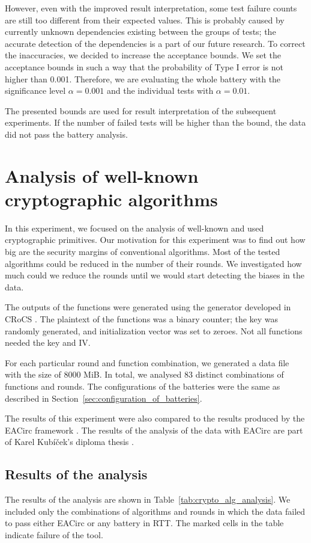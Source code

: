 \documentclass[
	digital,    %
	oneside,
	color,
	11pt,
	nocover,
	notable,
	nolof,
	nolot,
]{fithesis3}
\theoremstyle{definition}
\theoremstyle{remark}
\begin{document}
However, even with the improved result interpretation, some test failure counts are still too different from their expected values. This is probably caused by currently unknown dependencies existing between the groups of tests; the accurate detection of the dependencies is a part of our future research. To correct the inaccuracies, we decided to increase the acceptance bounds. We set the acceptance bounds in such a way that the probability of Type I error is not higher than 0.001. Therefore, we are evaluating the whole battery with the significance level $\alpha=0.001$ and the individual tests with $\alpha=0.01$.

The presented bounds are used for result interpretation of the subsequent experiments. If the number of failed tests will be higher than the bound, the data did not pass the battery analysis.

\section{Analysis of well-known cryptographic algorithms}
\label{sec:usable_testbed}
In this experiment, we focused on the analysis of well-known and used cryptographic primitives. Our motivation for this experiment was to find out how big are the security margins of conventional algorithms. Most of the tested algorithms could be reduced in the number of their rounds. We investigated how much could we reduce the rounds until we would start detecting the biases in the data.

The outputs of the functions were generated using the generator developed in CRoCS \cite{eacirc-streams}. The plaintext of the functions was a binary counter; the key was randomly generated, and initialization vector was set to zeroes. Not all functions needed the key and IV. 

For each particular round and function combination, we generated a data file with the size of 8000 MiB. In total,  we analysed 83 distinct combinations of functions and rounds. The configurations of the batteries were the same as described in Section~\ref{sec:configuration_of_batteries}. 

The results of this experiment were also compared to the results produced by the EACirc framework \cite{eacirc-github}. The results of the analysis of the data with EACirc are part of Karel Kubíček's diploma thesis \cite{kubicek-dp}.

\subsection{Results of the analysis}
The results of the analysis are shown in Table~\ref{tab:crypto_alg_analysis}. We included only the combinations of algorithms and rounds in which the data failed to pass either EACirc or any battery in RTT. The marked cells in the table indicate failure of the tool. 
\end{document}
